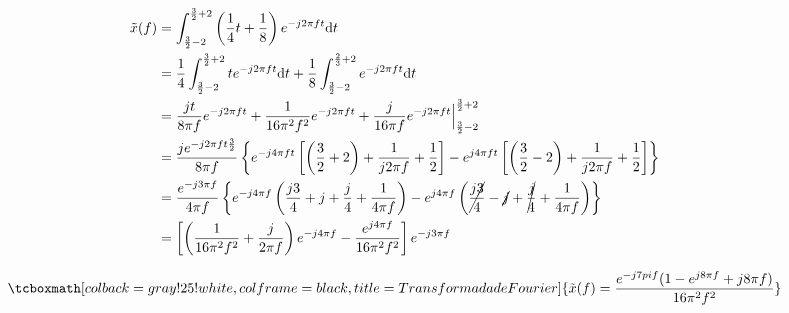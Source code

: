 \documentclass[11pt, twocolumn]{article}
\begin{document}
    \begin{equation*}
        \begin{split}
            \tilde{x}(f)& = \int_{\frac{3}{2} -2}^{\frac{3}{2} +2}\left(\frac{1}{4} t+\frac{1}{8} \right) e^{-j2\pi ft}\mathrm{d}t \\
                        & = \frac{1}{4} \int_{\frac{3}{2}-2}^{\frac{3}{2}+2}t e^{-j2\pi ft}\mathrm{d}t + \frac{1}{8} \int_{\frac{3}{2} -2}^{\frac{2}{3} +2} e^{-j2\pi ft}\mathrm{d}t \\
                        & = \frac{jt}{8\pi f} e^{-j2\pi ft} + \frac{1}{16\pi ^{2} f^2} e^{-j2\pi ft} + \frac{j}{16\pi f} e^{-j2\pi ft} \Big|_{\frac{3}{2} -2}^{\frac{3}{2} +2} \\
                        & = \frac{je^{-j2\pi ft\frac{3}{2}}}{8\pi f} \left\{e^{-j4\pi ft} \left[ \left(\frac{3}{2} + 2\right) + \frac{1}{j2\pi f} + \frac{1}{2}\right] 
                          - e^{j4\pi ft} \left[\left(\frac{3}{2} - 2\right) + \frac{1}{j2\pi f} + \frac{1}{2}\right]\right\} \\
                        & = \frac{e^{-j3\pi f}}{4\pi f} \left\{e^{-j4\pi f}\left(\frac{j3}{4}+j+\frac{j}{4}+\frac{1}{4\pi f}\right)   
                          - e^{j4\pi f} \left(\cancel{\frac{j3}{4}}-\cancel{j}+\cancel{\frac{j}{4}}+\frac{1}{4\pi f}\right)\right\} \\
                        & = \left[\left(\frac{1}{16\pi^2 f^2}+\frac{j}{2\pi f}\right)e^{-j4\pi f}-\frac{e^{j4\pi f}}{16\pi^2 f^2}\right] e^{-j3\pi f} \\
        \end{split}
    \end{equation*}  

    \begin{equation}
        \tcboxmath[colback=gray!25!white,colframe=black, title=Transformada de Fourier]{
            \tilde{x}(f) = \frac{e^{-j7pi f }(1 - e^{j8\pi f} + j8\pi f)}{16\pi^2 f^2}
        }
    \end{equation}

\printbibliography[title={Bibliografía}]
\nocite{Silva2021}
\end{document}
